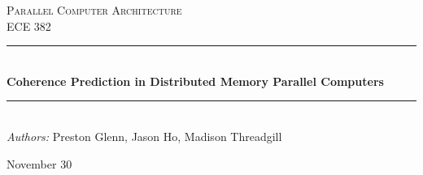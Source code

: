 \begin{titlepage}

\newcommand{\HRule}{\rule{\linewidth}{0.5mm}} 
\newcommand\course{Parallel Computer Architecture}
\newcommand\coursecode{ECE 382}
\newcommand\reporttitle{Coherence Prediction in Distributed Memory Parallel Computers}
\newcommand\name{Preston Glenn, Jason Ho, Madison Threadgill}

\newcommand\duedate{November 30}




\center %

\vspace*{4cm}
 
\textsc{\Large \course}\\[0.5cm] 
\textsc{\large \coursecode}\\[0.5cm] 


\HRule \\[0.4cm]
{\Large \bfseries \reporttitle}\\[0.4cm]
\HRule \\[0.4cm]
 

\large \emph{Authors:} \name \\ 
\vspace{6cm}

{\large \duedate}\\[2cm] 

\vfill 

\end{titlepage}